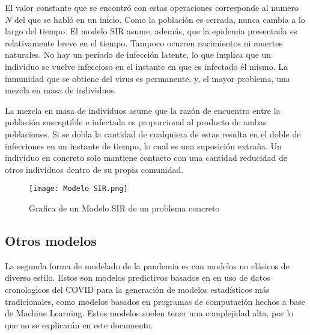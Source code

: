 El valor constante que se encontró con estas operaciones corresponde al numero $N$ del que se habló en un inicio. Como la población es cerrada, nunca cambia a lo largo del tiempo. El modelo SIR asume, además, que la epidemia presentada es relativamente breve en el tiempo. Tampoco ocurren nacimientos ni muertes naturales. No hay un periodo de infección latente, lo que implica que un individuo se vuelve infeccioso en el instante en que es infectado él mismo. La inmunidad que se obtiene del virus es permanente, y, el mayor problema, una mezcla en masa de individuos.

La mezcla en masa de individuos asume que la razón de encuentro entre la población susceptible e infectada es proporcional al producto de ambas poblaciones. Si se dobla la cantidad de cualquiera de estas resulta en el doble de infecciones en un instante de tiempo, lo cual es una suposición extraña. Un individuo en concreto solo mantiene contacto con una cantidad reducidad de otros individuos dentro de su propia comunidad.



\begin{figure}
    \texttt{[image: Modelo SIR.png]}
    \caption{Grafica de un Modelo SIR de un problema concreto \cite{weiss_2013}}
\end{figure}

\subsection{Otros modelos}
La segunda forma de modelado de la pandemia es con modelos no clásicos de diverso estilo. Estos son modelos predictivos basados en en uso de datos cronologicos del COVID para la generación de modelos estadísticos más tradicionales, como modelos basados en programas de computación hechos a base de Machine Learning. Estos modelos suelen tener una complejidad alta, por lo que no se explicarán en este documento.